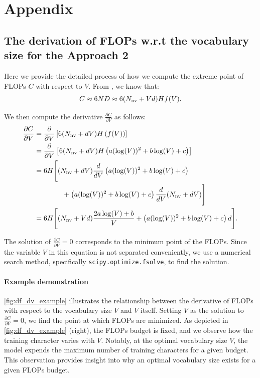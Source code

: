 \appendix
\section{Appendix}
\subsection{The derivation of FLOPs w.r.t the vocabulary size for the Approach 2}
\label{append:df_dv}
Here we provide the detailed process of how we compute the extreme point of FLOPs $C$ with respect to $V$. From \citet{kaplan2020scaling}, we know that:
\begin{equation}
\label{eq:flops}
    C \approx 6ND \approx 6(N_{\rm nv}+Vd)Hf(V).
\end{equation}

We then compute the derivative $\frac{\partial C}{\partial V}$ as follows:
\begin{align*}
\frac{\partial C}{\partial V} &= \frac{\partial}{\partial V} \left[ 6(N_{\rm nv} + dV)H \left( f(V) \right) \right] \\
&= \frac{\partial}{\partial V} \left[ 6(N_{\rm nv} + dV)H \left( a(\log(V))^2 + b\log(V) + c \right) \right] \\
&= 6H \Bigg[ (N_{\rm nv} + dV) \frac{d}{dV} \left( a(\log(V))^2 + b\log(V) + c \right) \\
&\quad\quad\quad\quad + \left( a(\log(V))^2 + b\log(V) + c \right) \frac{d}{dV}(N_{\rm nv} + dV) \Bigg] \\
&= 6H \Bigg[ (N_{\rm nv} + Vd) \frac{2a \log(V) + b}{V} + \left(a (\log(V))^2 + b \log(V) + c\right)d \Bigg].
\end{align*}

The solution of $\frac{\partial C}{\partial V}=0$ corresponds to the minimum point of the FLOPs. Since the variable $V$ in this equation is not separated conveniently, we use a numerical search method, specifically \texttt{scipy.optimize.fsolve}, to find the solution. 

\paragraph{Example demonstration}
\autoref{fig:df_dv_example} illustrates the relationship between the derivative of FLOPs with respect to the vocabulary size $V$ and $V$ itself. Setting $V$ as the solution to $\frac{\partial C}{\partial V}=0$, we find the point at which FLOPs are minimized. As depicted in \autoref{fig:df_dv_example} (right), the FLOPs budget is fixed, and we observe how the training character varies with $V$. Notably, at the optimal vocabulary size $V$, the model expends the maximum number of training characters for a given budget. This observation provides insight into why an optimal vocabulary size exists for a given FLOPs budget.




